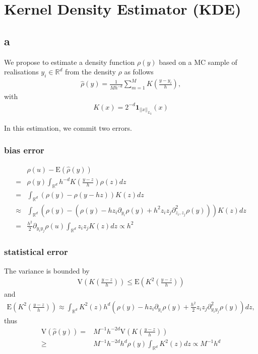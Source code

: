 \documentclass[a4paper,11pt]{article}
\newcommand{\parent}[1]{\left( {#1} \right)}
\newcommand{\absval}[1]{\left| {#1} \right|}
\newcommand{\ssum}[2]{\displaystyle\sum\limits_{#1}^{#2}}
\newcommand{\nnorm}[2]{\absval{\absval{{#1}}}_{#2}}
\newcommand{\expp}[1]{\mathrm{E} \parent{{#1}}}
\begin{document}
\section*{Kernel Density Estimator (KDE)}

\subsection*{a}

We propose to estimate
a density function $\rho \parent{y}$
based on a MC sample of realisations $y_i \in \mathbb R^d$
from the density $\rho$ as follows
\begin{align}
\hat \rho \parent{y} = \frac{1}{M h^{-d}} \ssum{m=1}{M} K \parent{\frac{y-y_i}{h}},
\end{align}
with
\begin{align}
K \parent{x} = 2^{-d} \mathbf 1_{\nnorm{x}{L_2}} \parent{x}
\end{align}

In this estimation, we commit two errors.

\subsubsection*{bias error}

\begin{align}&\rho \parent{u} - \expp{\hat \rho \parent{y}}
\\
=& 
\rho \parent{y }
\int_{\mathbb R^d} h^{-d} K \parent{\frac{y-z}{h}} \rho \parent{z} dz
\\
=& \int_{\mathbb R^d} \parent{\rho \parent{y}- \rho \parent{y-h z}}  K\parent{z} dz
\\
\approx & 
\int_{\mathbb R^d}
\parent{\rho \parent{y} - \parent{\rho \parent{y} - h z_i \partial_{y_i} \rho \parent{y} + h^2 z_i z_j \partial_{z_i,z_j}^2 \rho \parent{y} }}
K \parent{z}
dz
\\
= & \frac{h^2}{2}  \partial_{y_i y_j} \rho \parent{u} \int_{\mathbb R^d} z_i z_j K \parent{z}  dz \propto h^2
\end{align}

\subsubsection*{statistical error}

The variance is bounded by
\begin{align}
\mathrm{V} \parent{K \parent{\frac{y-z}{h}}} \leq \expp{K^2 \parent{\frac{y-z}{h}}}
\end{align}
and
\begin{align}
\expp{K^2 \parent{\frac{y-z}{h}}}
\approx
\int_{\mathbb R^d}
K^2 \parent{z} h^d \parent{\rho \parent{y} - h z_i \partial_{y_i} \rho \parent{y} + \frac{h^2}{2} z_i z_j \partial_{y_i y_j}^2 \rho \parent{y} }
dz,
\end{align}
thus
\begin{align}
\mathrm{V} \parent{\hat \rho \parent{y}}
=& M^{-1} h^{-2d} \mathrm{V} \parent{K \parent{\frac{y-z}{h}}}
\\
\geq& M^{-1} h^{-2d} h^{d} \rho \parent{y} \int_{\mathbb R^d} K^2 \parent{z} dz
\propto M^{-1} h^{d}
\end{align}
\end{document}
